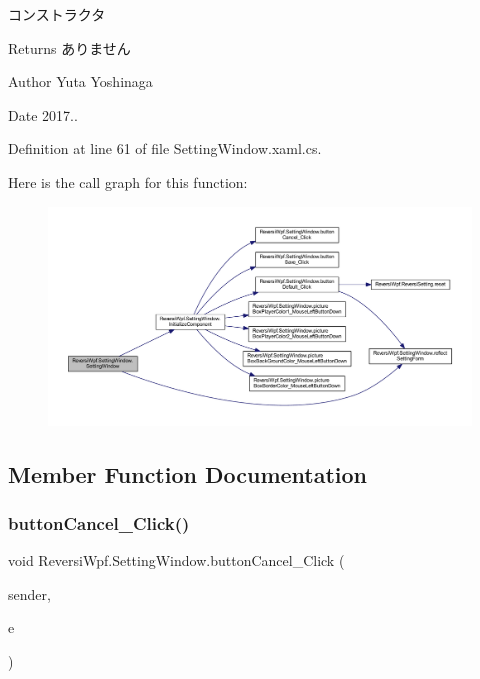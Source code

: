 コンストラクタ 

\begin{DoxyReturn}{Returns}
ありません 
\end{DoxyReturn}
\begin{DoxyAuthor}{Author}
Yuta Yoshinaga 
\end{DoxyAuthor}
\begin{DoxyDate}{Date}
2017.. 
\end{DoxyDate}


Definition at line 61 of file Setting\+Window.\+xaml.\+cs.

Here is the call graph for this function\+:\nopagebreak
\begin{figure}[H]
\begin{center}
\leavevmode
\includegraphics[width=350pt]{class_reversi_wpf_1_1_setting_window_a6ea5c654540c8cded2c7bef2187d446e_cgraph}
\end{center}
\end{figure}


\subsection{Member Function Documentation}
\mbox{\label{class_reversi_wpf_1_1_setting_window_aacca71ce9e594912ca597fe41f5e6466}} 
\subsubsection{\texorpdfstring{button\+Cancel\+\_\+\+Click()}{buttonCancel\_Click()}}
{\footnotesize\ttfamily void Reversi\+Wpf.\+Setting\+Window.\+button\+Cancel\+\_\+\+Click (\begin{DoxyParamCaption}\item[{object}]{sender,  }\item[{Routed\+Event\+Args}]{e }\end{DoxyParamCaption})\hspace{0.3cm}{\ttfamily [private]}}



